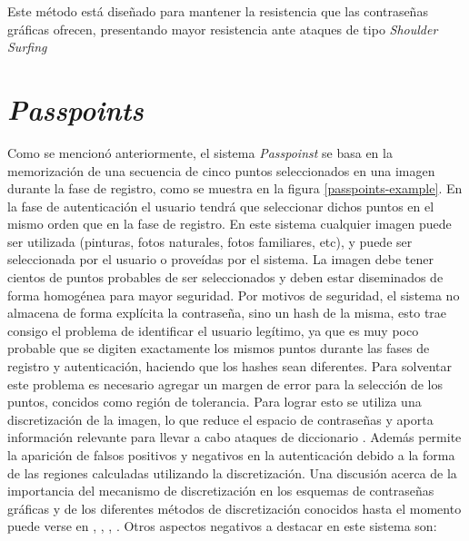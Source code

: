 Este método está diseñado para mantener la resistencia que las contraseñas gráficas ofrecen, presentando mayor resistencia ante ataques de tipo \textit{Shoulder Surfing} 
 \cite{lashkari2009shoulder}






\section{\textit{Passpoints}}

Como se mencionó anteriormente, el sistema \textit{Passpoinst} \cite{wiedenbeck2005passpoints} se basa en la memorización de una secuencia de cinco puntos seleccionados en una imagen durante la fase de registro, como se muestra en la figura \ref{passpoints-example}.  En la fase de autenticación el usuario tendrá  que  seleccionar dichos puntos en el mismo orden que en la fase de registro. En  este  sistema  cualquier  imagen  puede  ser  utilizada  (pinturas,  fotos  naturales,  fotos  familiares,  etc),  y  puede  ser seleccionada  por  el  usuario  o proveídas por  el  sistema.  La  imagen  debe  tener  cientos  de  puntos  probables  de  ser seleccionados y deben estar diseminados de forma homogénea para mayor seguridad. 
Por motivos de seguridad, el sistema  no  almacena  de  forma explícita la contraseña,  sino  un hash  de la  misma,  esto  trae  consigo  el  problema de identificar el usuario legítimo, ya que es muy poco probable que se digiten exactamente los mismos puntos durante las fases de registro y autenticación, haciendo que los hashes sean diferentes. 
Para solventar este problema es necesario agregar un margen de error para la selección de los puntos, concidos como región de tolerancia. Para lograr esto se utiliza una discretización de la imagen, lo que reduce el espacio de contraseñas y aporta información relevante para  llevar  a  cabo  ataques  de  diccionario \cite{zhu2013security}. Además  permite  la  aparición  de  falsos  positivos  y negativos  en  la autenticación  debido  a  la  forma  de  las  regiones  calculadas  utilizando  la  discretización.  Una  discusión  acerca  de  la importancia del mecanismo de discretización en los esquemas de contraseñas gráficas y de los diferentes métodos de discretización conocidos hasta el momento puede verse en \cite{birget2006graphical}, \cite{chiasson2008centered}, \cite{bicakci2008optimal}, \cite{kirovski2007click}. 
Otros aspectos negativos a destacar en este sistema son: 


